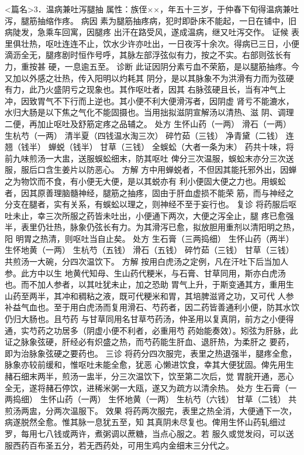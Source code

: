 \documentclass[a4paper,12pt,UTF8,twoside]{ctexbook}
\begin{document}
<篇名>3．温病兼吐泻腿抽
属性：族侄××，年五十三岁，于仲春下旬得温病兼吐泻，腿筋抽缩作疼。 
病因 素为腿筋抽疼病，犯时即卧床不能起，一日在铺中，旧病陡发，急乘车回寓，因腿疼 
出汗在路受风，遂成温病，继又吐泻交作。 
证候 表里俱壮热，呕吐连连不止，饮水少许亦吐出，一日夜泻十余次。得病已三日，小便 
滴沥全无，腿疼剧时恒作号呼，其脉左部浮弦似有力，按之不实。右部则弦长有力，重按甚 
硬，一息逾五至。 
诊断 此证因阴分素亏血不荣筋，是以腿筋抽疼。今又加以外感之壮热，传入阳明以灼耗其 
阴分，是以其脉象不为洪滑有力而为弦硬有力，此乃火盛阴亏之现象也。其作呕吐者，因其 
右脉弦硬且长，当有冲气上冲，因致胃气不下行而上逆也。其小便不利大便滑泻者，因阴虚 
肾亏不能漉水，水归大肠是以下焦之气化不能固摄也。当用拙拟滋阴宣解汤以清热、滋 
阴、调理二便，再加止呕吐及舒筋定疼之品辅之。 
处方 生怀山药（一两） 滑石（一两） 生杭芍（一两） 清半夏（四钱温水淘三次） 
碎竹茹（三钱） 净青黛（二钱） 连翘（钱半） 蝉蜕（钱半） 
甘草（三钱） 全蜈蚣（大者一条为末） 
药共十味，将前九味煎汤一大盅，送服蜈蚣细末，防其呕吐 
俾分三次温服，蜈蚣末亦分三次送服，服后口含生姜片以防恶心。 
方解 方中用蝉蜕者，不但因其能托邪外出，因蝉之为物饮而不食，有小便无大便，是以其蜕亦有 
利小便固大便之力也。用蜈蚣者，因其原善理脑髓神经，腿筋之抽疼，固由于肝血虚损不能荣 
筋，而与神经之分支在腿者，实有关系，有蜈蚣以理之，则神经不至于妄行也。 
复诊 将药服后呕吐未止，幸三次所服之药皆未吐出，小便通下两次，大便之泻全止，腿 
疼已愈强半，表里仍壮热，脉象仍弦长有力。为其滑泻已愈，拟放胆用重剂以清阳明之热，阳 
明胃之热清，则呕吐当自止矣。 
处方 生石膏（三两捣细） 生怀山药（两半） 生怀地黄（一两） 生杭芍（五钱） 
滑石（五钱） 碎竹茹（三钱） 甘草（三钱） 
共煎汤一大碗，分四次温饮下。 
方解 按用白虎汤之定例，凡在汗吐下后当加人参。此方中以生 
地黄代知母、生山药代粳米，与石膏、甘草同用，斯亦白虎汤也。而不加人参者，以其吐犹未止，加之恐助 
胃气上升，于斯变通其方，重用生山药至两半，其冲和稠粘之液，既可代粳米和胃，其培脾滋肾之功，又可代 
人参补益气血也。至于用白虎汤而复用滑石、芍药者，因二药皆善通利小便，防其水饮仍归大肠也。且芍药 
与甘草同用名甘草芍药汤，仲圣用以复真阴，前方之小便得通，实芍药之功居多（阴虚小便不利者，必重用芍 
药始能奏效）。矧弦为肝脉，此证之脉象弦硬，肝经必有炽盛之热，而芍药能生肝血、退肝热，为柔肝之 
要药，即为治脉象弦硬之要药也。 
三诊 将药分四次服完，表里之热退强半，腿疼全愈，脉象亦较前缓和，惟呕吐未能全愈，犹恶 
心懒进饮食，幸其大便犹固。俾先用生赭石细末两半，煎汤一盅半，分三次温饮下，饮至第二次后，觉 
胃脘开通，恶心全无，遂将赭石停饮，进稀米粥一大瓯，遂又为疏方以清余热。 
处方 生石膏（一两捣细） 生怀山药（一两） 生怀地黄（一两） 生杭芍（六钱） 甘草（二钱） 
共煎汤两盅，分两次温服下。 
效果 将药两次服完，表里之热全消，大便通下一次，病遂脱然全愈。惟其脉一息犹五至，知 
其真阴未尽复也。俾用生怀山药轧细过罗，每用七八钱或两许，煮粥调以蔗糖，当点心服之。若 
服久或觉发闷，可以送服西药百布圣五分，若无西药处，可用生鸡内金细末三分代之。 
\end{document}
